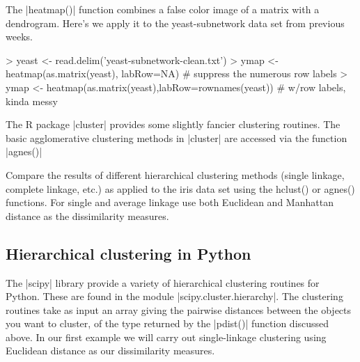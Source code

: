 
The |heatmap()| function combines a false color image of a matrix with a dendrogram. Here's we apply it to the yeast-subnetwork data set from previous weeks.

\begin{R}
> yeast <- read.delim('yeast-subnetwork-clean.txt')
> ymap <- heatmap(as.matrix(yeast), labRow=NA) # suppress the numerous row labels
> ymap <- heatmap(as.matrix(yeast),labRow=rownames(yeast)) # w/row labels, kinda messy
\end{R}

The R package |cluster| provides some slightly fancier clustering routines. The basic agglomerative clustering methods in |cluster| are accessed via the function |agnes()| 

Compare the results of different hierarchical clustering methods (single linkage, complete linkage, etc.) as applied to the iris data set using the hclust() or agnes() functions. For single and average linkage use both Euclidean and Manhattan distance as the dissimilarity measures.


\subsection{Hierarchical clustering in Python}

The |scipy| library provide a variety of hierarchical clustering routines for Python.  These are found in the module |scipy.cluster.hierarchy|.  The clustering routines take as input an array giving the pairwise distances between the objects you want to cluster, of the type returned by the |pdist()| function discussed above. In our first example we will carry out single-linkage clustering using Euclidean distance as our dissimilarity measures.


